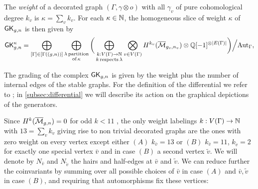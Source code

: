 The \emph{weight} of a decorated graph $(\Gamma,\gamma\otimes o)$ with all $\gamma_v$ of pure cohomological degree $k_v$ is $\kappa=\sum_v k_v$. For each $\kappa\in\mathbb{N}$, the homogeneous slice of weight $\kappa$ of $\mathsf{GK}_{g,n}$ is then given by 
\begin{equation}\label{equ:GKweight}
    \mathsf{GK}^{\kappa}_{g,n} 
    = \bigoplus_{[\Gamma]\in[\Gamma((g,n))]} \bigoplus_{\substack{\lambda\,\text{partition} \\ \text{of}\,\kappa}} \bigg( \bigoplus_{\substack{k:V(\Gamma)\rightarrow \mathbb{N} \\ k\,\text{respects}\,\lambda}}
    \bigotimes_{v\in V(\Gamma)}H^{k_v}(\overline{\mathcal{M}}_{g_v,n_v})\otimes \mathbb{Q}[-1]^{\otimes |E(\Gamma)|} \bigg) \Big/ \text{Aut}_{\Gamma},
\end{equation}

The grading of the complex $\mathsf{GK}_{g,n}$ is given by the weight plus the number of internal edges of the stable graphs. For the definition of the differential we refer to \cite{CLPW2}; in \ref{subsec:differential} we will describe its action on the graphical depictions of the generators.

Since $H^{k}(\overline{\mathcal{M}}_{g,n})=0$ for odd $k<11$ \cite{BergstromFaberPayne}, the only weight labelings $k:V(\Gamma)\rightarrow\mathbb{N}$ with $13=\sum_v k_v$ giving rise to non trivial decorated graphs are the ones with zero weight on every vertex except either $(A)$ $k_{\bar{v}}=13$ or $(B)$ $k_{\bar{v}}=11$, $k_{\tilde{v}}=2$ for exactly one special vertex $\bar{v}$ and in case $(B)$ a second vertex $\tilde{v}$. We will denote by $N_{\bar{v}}$ and $N_{\tilde{v}}$ the hairs and half-edges at $\bar{v}$ and $\tilde{v}$. We can reduce further the coinvariants by summing over all possible choices of $\bar{v}$ in case $(A)$ and $\bar{v},\tilde{v}$ in case $(B)$, and requiring that automorphisms fix these vertices:

